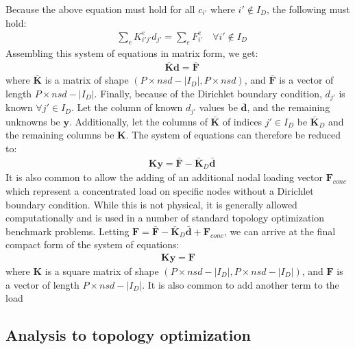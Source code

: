 	Because the above equation must hold for all $c_{i'}$ where $i' \notin I_D$, the following must hold:
	\begin{align}
		& \sum_e K^e_{i'j'} d_{j'} = \sum_e F^e_{i'} \quad \forall i' \notin I_D
	\end{align}
	Assembling this system of equations in matrix form, we get:
	\begin{align}
		& \bm{\bar{K}} \bm{d} = \bm{\bar{F}}
	\end{align}
	where $\bm{\bar{K}}$ is a matrix of shape $(P \times nsd - |I_D|, P \times nsd)$, and $\bm{\bar{F}}$ is a vector of length $P \times nsd - |I_D|$. Finally, because of the Dirichlet boundary condition, $d_{j'}$ is known $\forall j' \in I_D$. Let the column of known $d_{j'}$ values be $\bm{\bar{d}}$, and the remaining unknowns be $\bm{y}$. Additionally, let the columns of $\bm{\bar{K}}$ of indices $j' \in I_D$ be $\bm{\bar{K}}_D$ and the remaining columns be $\bm{K}$. The system of equations can therefore be reduced to:
	\begin{align}
		& \bm{K}\bm{y} = \bm{\bar{F}} - \bm{\bar{K}}_D \bm{\bar{d}}
	\end{align}
	It is also common to allow the adding of an additional nodal loading vector $\bm{F}_{conc}$ which represent a concentrated load on specific nodes without a Dirichlet boundary condition. While this is not physical, it is generally allowed computationally and is used in a number of standard topology optimization benchmark problems. Letting $\bm{F} = \bm{\bar{F}} - \bm{\bar{K}}_D \bm{\bar{d}} + \bm{F}_{conc}$, we can arrive at the final compact form of the system of equations:
	\begin{align} \label{final}
		\bm{K}\bm{y} = \bm{F}
	\end{align}
	where $\bm{K}$ is a square matrix of shape $(P \times nsd - |I_D|, P \times nsd - |I_D|)$, and $\bm{F}$ is a vector of length $P \times nsd  - |I_D|$. It is also common to add another term to the load

\subsection{Analysis to topology optimization}

